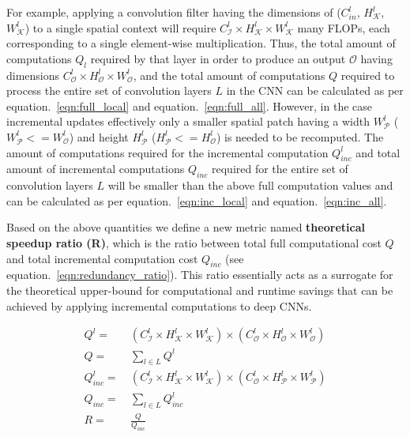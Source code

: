 For example, applying a convolution filter having the dimensions of ($C^l_{in}$, $H^l_{\mathcal{K}}$, $W^l_{\mathcal{K}}$) to a single spatial context will require $C^l_{\mathcal{I}} \times H^l_{\mathcal{K}} \times W^l_{\mathcal{K}}$ many FLOPs, each corresponding to a single element-wise multiplication. Thus, the total amount of computations $Q_l$ required by that layer in order to produce an output $\mathcal{O}$ having dimensions $C^l_{\mathcal{O}} \times H^l_{\mathcal{O}} \times W^l_{\mathcal{O}}$, and the total amount of computations $Q$ required to process the entire set of convolution layers $L$ in the CNN can be calculated as per equation.~\ref{eqn:full_local} and equation.~\ref{eqn:full_all}. However, in the case incremental updates effectively only a smaller spatial patch having a width $W^l_\mathcal{P}$ ($W^l_\mathcal{P}<=W^l_{\mathcal{O}}$) and height $H^l_\mathcal{P}$ ($H^l_\mathcal{P}<=H^l_{\mathcal{O}}$) is needed to be recomputed. The amount of computations required for the incremental computation $Q^l_{inc}$ and total amount of incremental computations $Q_{inc}$ required for the entire set of convolution layers $L$ will be smaller than the above full computation values and can be calculated as per equation.~\ref{eqn:inc_local} and equation.~\ref{eqn:inc_all}.

Based on the above quantities we define a new metric named \textbf{theoretical speedup ratio (R)}, which is the ratio between total full computational cost $Q$ and total incremental computation cost $Q_{inc}$ (see equation.~\ref{eqn:redundancy_ratio}). This ratio essentially acts as a surrogate for the theoretical upper-bound for computational and runtime savings that can be achieved by applying incremental computations to deep CNNs.

\begin{align}
\label{eqn:full_local}
Q^l =&~ (C^l_{\mathcal{I}} \times H^l_{\mathcal{K}} \times W^l_{\mathcal{K}}) \times (C^l_{\mathcal{O}} \times H^l_{\mathcal{O}} \times W^l_{\mathcal{O}})\\
\label{eqn:full_all}
Q =&~ \sum_{l \in L} Q^l\\
\label{eqn:inc_local}
Q_{inc}^l =&~ (C^l_{\mathcal{I}} \times H^l_{\mathcal{K}} \times W^l_{\mathcal{K}}) \times (C^l_{\mathcal{O}} \times H^l_{\mathcal{P}} \times W^l_{\mathcal{P}})\\
\label{eqn:inc_all}
Q_{inc} =&~ \sum_{l \in L} Q^l_{inc}\\
\label{eqn:redundancy_ratio}
R =&~ \frac{Q}{Q_{inc}}
\end{align}


